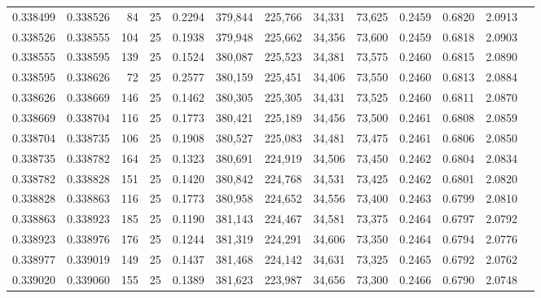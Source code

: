 \begin{tabular}{rrrrrrrrrrrrr}
0.338499 & 0.338526 &    84 &  25 &                                     0.2294 & 379,844 & 225,766 &  34,331 &  73,625 & 0.2459 & 0.6820 & 2.0913 \\
0.338526 & 0.338555 &   104 &  25 &                                     0.1938 & 379,948 & 225,662 &  34,356 &  73,600 & 0.2459 & 0.6818 & 2.0903 \\
0.338555 & 0.338595 &   139 &  25 &                                     0.1524 & 380,087 & 225,523 &  34,381 &  73,575 & 0.2460 & 0.6815 & 2.0890 \\
0.338595 & 0.338626 &    72 &  25 &                                     0.2577 & 380,159 & 225,451 &  34,406 &  73,550 & 0.2460 & 0.6813 & 2.0884 \\
0.338626 & 0.338669 &   146 &  25 &                                     0.1462 & 380,305 & 225,305 &  34,431 &  73,525 & 0.2460 & 0.6811 & 2.0870 \\
0.338669 & 0.338704 &   116 &  25 &                                     0.1773 & 380,421 & 225,189 &  34,456 &  73,500 & 0.2461 & 0.6808 & 2.0859 \\
0.338704 & 0.338735 &   106 &  25 &                                     0.1908 & 380,527 & 225,083 &  34,481 &  73,475 & 0.2461 & 0.6806 & 2.0850 \\
0.338735 & 0.338782 &   164 &  25 &                                     0.1323 & 380,691 & 224,919 &  34,506 &  73,450 & 0.2462 & 0.6804 & 2.0834 \\
0.338782 & 0.338828 &   151 &  25 &                                     0.1420 & 380,842 & 224,768 &  34,531 &  73,425 & 0.2462 & 0.6801 & 2.0820 \\
0.338828 & 0.338863 &   116 &  25 &                                     0.1773 & 380,958 & 224,652 &  34,556 &  73,400 & 0.2463 & 0.6799 & 2.0810 \\
0.338863 & 0.338923 &   185 &  25 &                                     0.1190 & 381,143 & 224,467 &  34,581 &  73,375 & 0.2464 & 0.6797 & 2.0792 \\
0.338923 & 0.338976 &   176 &  25 &                                     0.1244 & 381,319 & 224,291 &  34,606 &  73,350 & 0.2464 & 0.6794 & 2.0776 \\
0.338977 & 0.339019 &   149 &  25 &                                     0.1437 & 381,468 & 224,142 &  34,631 &  73,325 & 0.2465 & 0.6792 & 2.0762 \\
0.339020 & 0.339060 &   155 &  25 &                                     0.1389 & 381,623 & 223,987 &  34,656 &  73,300 & 0.2466 & 0.6790 & 2.0748 \\

\end{tabular}
